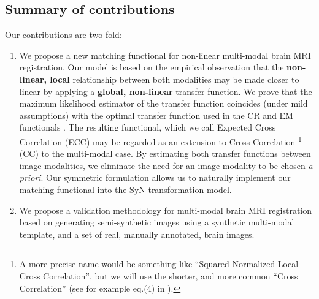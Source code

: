 \subsection{Summary of contributions}
Our contributions are two-fold:
\begin{enumerate}
\item{We propose a new matching functional for non-linear multi-modal brain MRI registration. Our model is based on the empirical observation that the \textbf{non-linear, local} relationship between both modalities may be made closer to linear by applying a \textbf{global, non-linear} transfer function. We prove that the maximum likelihood estimator of the transfer function coincides (under mild assumptions) with the optimal transfer function used in the CR and EM functionals \cite{Roche1998} \cite{Arce-santana2014}. The resulting functional, which we call Expected Cross Correlation (ECC) may be regarded as an extension to Cross Correlation \footnote{A more precise name would be something like ``Squared Normalized Local Cross Correlation'', but we will use the shorter, and more common ``Cross Correlation'' (see for example eq.(4) in \cite{Avants2008}).} (CC) to the multi-modal case. By estimating both transfer functions between image modalities, we eliminate the need for an image modality to be chosen {\it a priori}. Our symmetric formulation allows us to naturally implement our matching functional into the SyN \cite{Avants2011a} transformation model. }
\item{We propose a validation methodology for multi-modal brain MRI registration based on generating semi-synthetic images using a synthetic multi-modal template, and a set of real, manually annotated, brain images.}
\end{enumerate}

